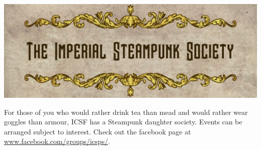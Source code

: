 \includegraphics[width=\textwidth,keepaspectratio]{pictures/steampunk_logo}

For those of you who would rather drink tea than mead and would rather wear goggles than armour, ICSF has a Steampunk daughter society. Events can be arranged subject to interest. Check out the facebook page at  \url{www.facebook.com/groups/icsps/}.
